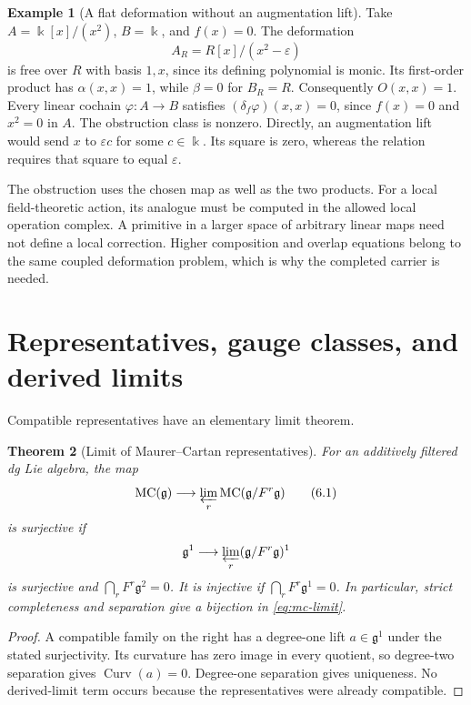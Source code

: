 \documentclass[11pt]{article}
\newtheorem{theorem}{Theorem}[section]
\theoremstyle{definition}
\newtheorem{example}[theorem]{Example}
\theoremstyle{remark}
\newcommand{\MC}{\operatorname{MC}}
\newcommand{\Curv}{\operatorname{Curv}}
\begin{document}
\begin{example}[A flat deformation without an augmentation lift]
\label{ex:augmentation-lift}
Take $A=\Bbbk[x]/(x^2)$, $B=\Bbbk$, and $f(x)=0$.
The deformation
\[
 A_R=R[x]/(x^2-\varepsilon)
\]
is free over $R$ with basis $1,x$, since its defining polynomial is monic.
Its first-order product has $\alpha(x,x)=1$, while $\beta=0$ for $B_R=R$.
Consequently $O(x,x)=1$.  Every linear cochain $\varphi:A\to B$ satisfies
$(\delta_f\varphi)(x,x)=0$, since $f(x)=0$ and $x^2=0$ in $A$.
The obstruction class is nonzero.  Directly, an augmentation lift would
send $x$ to $\varepsilon c$ for some $c\in\Bbbk$.
Its square is zero, whereas the relation requires that square to equal
$\varepsilon$.
\end{example}

The obstruction uses the chosen map as well as the two products.
For a local field-theoretic action, its analogue must be computed in the
allowed local operation complex.  A primitive in a larger space of
arbitrary linear maps need not define a local correction.  Higher
composition and overlap equations belong to the same coupled deformation
problem, which is why the completed carrier is needed.

\section{Representatives, gauge classes, and derived limits}

Compatible representatives have an elementary limit theorem.

\begin{theorem}[Limit of Maurer--Cartan representatives]
\label{thm:representative-limit}
For an additively filtered dg Lie algebra, the map
\[
 \MC(\mathfrak g)\longrightarrow
 \varprojlim_r\MC(\mathfrak g/F^r\mathfrak g)
 \tag{6.1}\label{eq:mc-limit}
\]
is surjective if
\[
 \mathfrak g^1\longrightarrow
 \varprojlim_r(\mathfrak g/F^r\mathfrak g)^1
\]
is surjective and $\bigcap_rF^r\mathfrak g^2=0$.  It is injective if
$\bigcap_rF^r\mathfrak g^1=0$.  In particular, strict completeness and
separation give a bijection in \eqref{eq:mc-limit}.
\end{theorem}

\begin{proof}
A compatible family on the right has a degree-one lift $a\in\mathfrak g^1$
under the stated surjectivity.  Its curvature has zero image in every
quotient, so degree-two separation gives $\Curv(a)=0$.  Degree-one separation
gives uniqueness.  No derived-limit term occurs because the representatives
were already compatible.
\end{proof}
\end{document}
